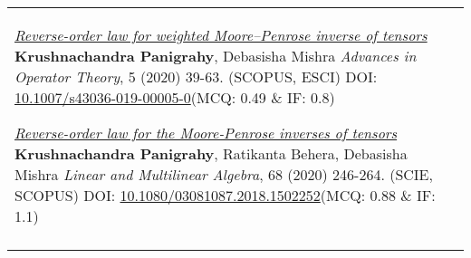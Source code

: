 \documentclass[a4paper,12pt]{article}
\begin{document}
\begin{longtable}{lp{15cm}}
\begin{etaremune}
\item \href{https://doi.org/10.1007/s43036-019-00005-0}{\it Reverse-order law for weighted Moore–Penrose inverse of tensors}\newline
{\footnotesize
{\bf Krushnachandra Panigrahy},  Debasisha Mishra\newline
{\it Advances in Operator Theory},  5 (2020) 39-63. \hfill{(SCOPUS, ESCI)}\newline
DOI: \href{https://doi.org/10.1007/s43036-019-00005-0}{10.1007/s43036-019-00005-0}\hfill(MCQ: 0.49 $\&$ IF: 0.8)
}

\item \href{https://doi.org/10.1080/03081087.2018.1502252}{\it Reverse-order law for the Moore-Penrose inverses of tensors}\newline
{\footnotesize 
{\bf Krushnachandra Panigrahy}, Ratikanta Behera,  Debasisha Mishra\newline
{\it Linear and Multilinear Algebra},
68 (2020) 246-264. \hfill{(SCIE, SCOPUS)}\newline
DOI: \href{https://doi.org/10.1080/03081087.2018.1502252}{10.1080/03081087.2018.1502252}\hfill(MCQ: 0.88 $\&$ IF: 1.1)
}
\end{etaremune}\\
\newpage
\multicolumn{2}{l}{\textsc{Research Preprints}}\\[0.2cm]

\end{longtable}
\end{document}
